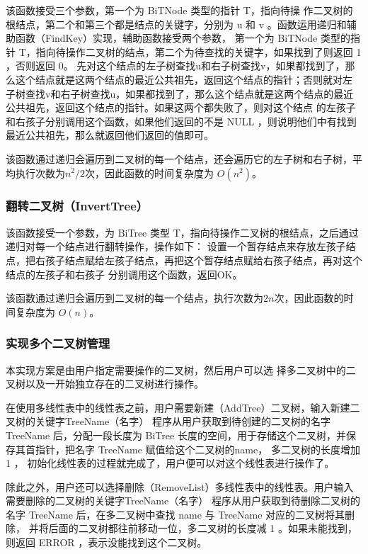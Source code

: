 \documentclass[supercite]{Experimental_Report}
\theoremstyle{definition}
\begin{document}
该函数接受三个参数，第一个为 BiTNode 类型的指针 T，指向待操
作二叉树的根结点，第二个和第三个都是结点的关键字，分别为 u 和 v 。函数运用递归和辅助函数（FindKey）实现，辅助函数接受两个参数，
第一个为 BiTNode 类型的指针 T，指向待操作二叉树的结点，第二个为待查找的关键字，如果找到了则返回 1 ，否则返回 0。
先对这个结点的左子树查找u和右子树查找v，如果都找到了，那么这个结点就是这两个结点的最近公共祖先，返回这个结点的指针；否则就对左
子树查找v和右子树查找u，如果都找到了，那么这个结点就是这两个结点的最近公共祖先，返回这个结点的指针。如果这两个都失败了，则对这个结点
的左孩子和右孩子分别调用这个函数，如果他们返回的不是 NULL ，则说明他们中有找到最近公共祖先，那么就返回他们返回的值即可。

该函数通过递归会遍历到二叉树的每一个结点，还会遍历它的左子树和右子树，平均执行次数为$n^2/2$次，因此函数的时间复杂度为 $O(n^2)$。

\subsubsection{翻转二叉树（InvertTree）}

该函数接受一个参数，为 BiTree 类型 T，指向待操作二叉树的根结点，之后通过递归对每一个结点进行翻转操作，操作如下：
设置一个暂存结点来存放左孩子结点，把右孩子结点赋给左孩子结点，再把这个暂存结点赋给右孩子结点，再对这个结点的左孩子和右孩子
分别调用这个函数，返回OK。

该函数通过递归会遍历到二叉树的每一个结点，执行次数为$2n$次，因此函数的时间复杂度为 $O(n)$。

\subsubsection{实现多个二叉树管理}

本实现方案是由用户指定需要操作的二叉树，然后用户可以选
择多二叉树中的二叉树以及一开始独立存在的二叉树进行操作。

在使用多线性表中的线性表之前，用户需要新建（AddTree）二叉树，输入新建二叉树的关键字TreeName（名字）
程序从用户获取到待创建的二叉树的名字 TreeName 后，分配一段长度为 BiTree
长度的空间，用于存储这个二叉树，并保存其首指针，把名字 TreeName 赋值给这个二叉树的name， 多二叉树的长度增加 1 ，
初始化线性表的过程就完成了，用户便可以对这个线性表进行操作了。

除此之外，用户还可以选择删除（RemoveList）多线性表中的线性表。用户输入需要删除的二叉树的关键字TreeName（名字）
程序从用户获取到待删除二叉树的名字 TreeName 后，在多二叉树中查找 name 与 TreeName 对应的二叉树将其删除，
并将后面的二叉树都往前移动一位，多二叉树的长度减 1 。如果未能找到，则返回 ERROR ，表示没能找到这个二叉树。
\end{document}
